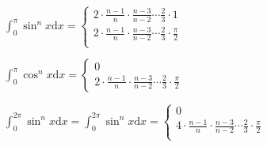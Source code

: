 \begin{spacing}{\hangju}
    \noindent $\int_{0}^{\pi}{\sin^n{x}}\mathrm{d}x = \left\{ \begin{array}{l}
        2 \cdot \frac{n - 1}{n} \cdot \frac{n - 3}{n - 2} \cdots \frac{2}{3} \cdot 1 \\
        2 \cdot \frac{n - 1}{n} \cdot \frac{n - 3}{n - 2} \cdots \frac{2}{3} \cdot \frac{\pi}{2} \\
    \end{array}\right.$

    \noindent $\int_{0}^{\pi}{\cos^n{x}}\mathrm{d}x = \left\{ \begin{array}{l}
        0 \\
        2 \cdot \frac{n - 1}{n} \cdot \frac{n - 3}{n - 2} \cdots \frac{2}{3} \cdot \frac{\pi}{2}
    \end{array}\right.$

    \noindent $\int_{0}^{2\pi}{\sin^n{x}}\mathrm{d}x = \int_{0}^{2\pi}{\sin^n{x}}\mathrm{d}x =
        \left\{ \begin{array}{l}
        0 \\
        4 \cdot \frac{n - 1}{n} \cdot \frac{n - 3}{n - 2} \cdots \frac{2}{3} \cdot \frac{\pi}{2} \\
    \end{array}\right. $
\end{spacing}
